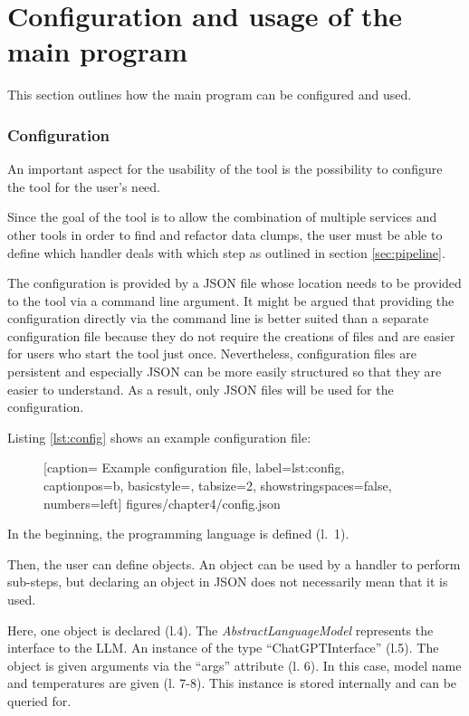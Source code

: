 \section{Configuration and usage of the main program}\label{sec:config}
This section outlines how the main program can be configured and used.

\subsubsection{Configuration}
An important aspect for the usability of the tool is the possibility to configure the tool for the user's need. 

Since the goal of the tool is to allow the combination of multiple services and other tools in order to find and refactor data clumps, the user must be able to define which handler deals with which step  as outlined in section \ref{sec:pipeline}.

The configuration is provided by a \ac{JSON} file whose location needs to be provided to the tool via a command line argument. It might be argued that providing the configuration directly via the command line is better suited than a separate configuration file because they do not require the creations of files and are easier for users who start the tool just once. Nevertheless, configuration files are persistent and especially \ac{JSON} can be more easily structured so that they are easier to understand. As a result, only \ac{JSON} files will be used  for the configuration. 


Listing \ref{lst:config} shows an example configuration file:
  \begin{figure} [htbp!]
			
			[caption={ Example configuration file},
			label={lst:config},
			captionpos=b, basicstyle=\footnotesize, tabsize=2, showstringspaces=false,  numbers=left]
			{figures/chapter4/config.json}
		\end{figure}


In the beginning, the programming language is defined (l.~1). 

Then, the user can define objects. An object can be used by a handler to perform sub-steps, but declaring an object in \ac{JSON} does not necessarily mean that it is used. 

Here, one object is declared (l.4). The \textit{AbstractLanguageModel} represents the interface to the \ac{LLM}.  An instance of the type \enquote{ChatGPTInterface} (l.5). The object is given arguments via the \enquote{args} attribute (l. 6). In this case, model name and temperatures are given (l. 7-8).  This instance is stored internally and can be queried for.   

